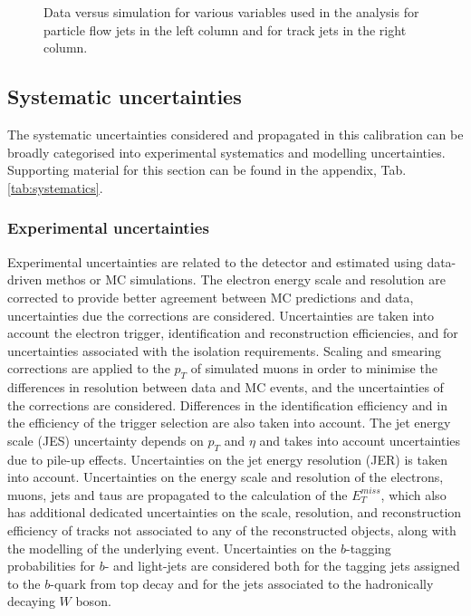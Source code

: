 \documentclass[letterpaper,12pt]{article}
\begin{document}
\begin{figure}%
		\centering
		\\
		\\
		\caption{Data versus simulation for various variables used in the analysis for 
		particle flow jets in the left column and for track jets in the right column.}
		\label{fig:kinematic_distributions_combined}
\end{figure}
		

\subsection{Systematic uncertainties}
\label{systematic uncertainties}
The systematic uncertainties considered and propagated in this calibration 
can be broadly categorised into experimental systematics and modelling uncertainties. 
Supporting material for this section can be found in the appendix, Tab.\ref{tab:systematics}.
\subsubsection{Experimental uncertainties}

Experimental uncertainties are related to the detector and estimated using 
data-driven methos or MC simulations. 
The electron energy scale and resolution are corrected to 
provide better agreement between MC predictions and data, uncertainties 
due the corrections are considered. Uncertainties are taken into account the 
electron trigger, identification and reconstruction efficiencies, and for 
uncertainties associated with the isolation requirements. Scaling and smearing 
corrections are applied to the $p_T$ of simulated muons in order to minimise the differences 
in resolution between data and MC events, and the uncertainties of the corrections are considered. 
Differences in the identification efficiency and in the efficiency of the trigger selection are 
also taken into account. The jet energy scale (JES) uncertainty depends on $p_T$ and $\eta$ and 
takes into account uncertainties due to pile-up effects. Uncertainties on the jet energy resolution (JER) 
is taken into account. Uncertainties on the energy scale and resolution of 
the electrons, muons, jets and taus are propagated to the calculation of the $E_T^{miss}$, 
which also has additional dedicated uncertainties on the scale, resolution, and 
reconstruction efficiency of tracks not associated to any of the reconstructed objects,
 along with the modelling of the underlying event. Uncertainties on the $b$-tagging probabilities 
 for $b$- and light-jets are considered both for the tagging jets assigned to the $b$-quark 
 from top decay and for the jets associated to the hadronically decaying $W$ boson.
\end{document}
